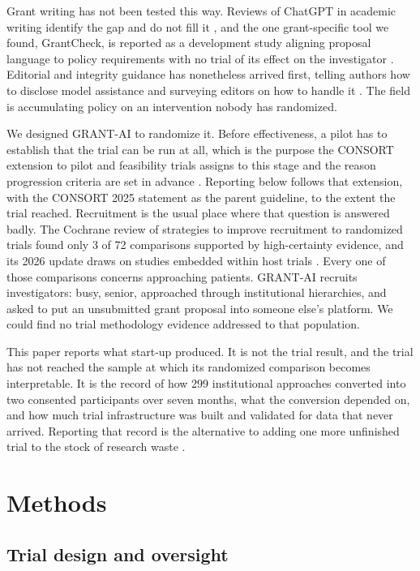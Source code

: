 \documentclass[11pt,a4paper]{article}
\begin{document}
Grant writing has not been tested this way. Reviews of ChatGPT in academic writing identify the gap and do not fill it \cite{r16}, and the one grant-specific tool we found, GrantCheck, is reported as a development study aligning proposal language to policy requirements with no trial of its effect on the investigator \cite{r17}. Editorial and integrity guidance has nonetheless arrived first, telling authors how to disclose model assistance \cite{r18} and surveying editors on how to handle it \cite{r19}. The field is accumulating policy on an intervention nobody has randomized.

We designed GRANT-AI to randomize it. Before effectiveness, a pilot has to establish that the trial can be run at all, which is the purpose the CONSORT extension to pilot and feasibility trials assigns to this stage \cite{r20,r21} and the reason progression criteria are set in advance \cite{r22}. Reporting below follows that extension, with the CONSORT 2025 statement \cite{r23} as the parent guideline, to the extent the trial reached. Recruitment is the usual place where that question is answered badly. The Cochrane review of strategies to improve recruitment to randomized trials found only 3 of 72 comparisons supported by high-certainty evidence, and its 2026 update draws on studies embedded within host trials \cite{r24,r25}. Every one of those comparisons concerns approaching patients. GRANT-AI recruits investigators: busy, senior, approached through institutional hierarchies, and asked to put an unsubmitted grant proposal into someone else's platform. We could find no trial methodology evidence addressed to that population.

This paper reports what start-up produced. It is not the trial result, and the trial has not reached the sample at which its randomized comparison becomes interpretable. It is the record of how 299 institutional approaches converted into two consented participants over seven months, what the conversion depended on, and how much trial infrastructure was built and validated for data that never arrived. Reporting that record is the alternative to adding one more unfinished trial to the stock of research waste \cite{r26}.

\section{Methods}

\subsection{Trial design and oversight}
\end{document}
